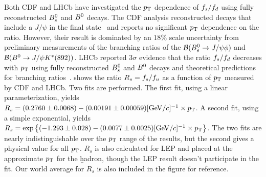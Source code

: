 Both CDF and LHCb have investigated the $p_{\rm T}$ dependence of $f_{s}/f_{d}$ using fully 
reconstructed $B^0_s$ and $B^0$ decays.  The CDF analysis reconstructed decays that include 
a $J/\psi$ in the final state~\cite{CDFnote10795:2012} and reports no significant $p_{\rm T}$ dependence 
on the ratio.  However, their result is dominated by an $18$\% scale uncertainty
from preliminary measurements of the branching ratios of the ${\cal B}(B^0_s\to J/\psi \phi)$ and 
${\cal B}(B^0\to J/\psi K^{*}(892))$.
LHCb reported $3\sigma$ evidence that the ratio $f_{s}/f_{d}$ decreases with 
$p_{\rm T}$ using fully reconstructed $B^0_s$ and $B^0$ decays and theoretical predictions for branching ratios~\cite{Aaij:2013qqa}.  shows
the ratio $R_s = f_{s}/f_{u}$ as a function of $p_{\rm T}$ measured by CDF and LHCb.
Two fits are performed. %
The first fit, using a linear parameterization, yields
$R_s = (0.2760\pm 0.0068) - (0.00191\pm 0.00059)[{\rm GeV}/c]^{-1} \times p_{\rm T}$.  
A second fit, using a simple exponential, yields
$R_s = \exp\left\{(-1.293\pm 0.028) - (0.0077\pm 0.0025)[{\rm GeV}/c]^{-1} \times p_{\rm T}\right\}$.  
The two fits are nearly indistinguishable over the $p_{\rm T}$ range of the results,
but the second gives a physical value for all $p_{\rm T}$.  $R_s$ is also calculated
for LEP and placed at the approximate $p_{\rm T}$ for the \b hadron, though the LEP result
doesn't participate in the fit.  Our world average for $R_s$ is also included in the
figure for reference.

